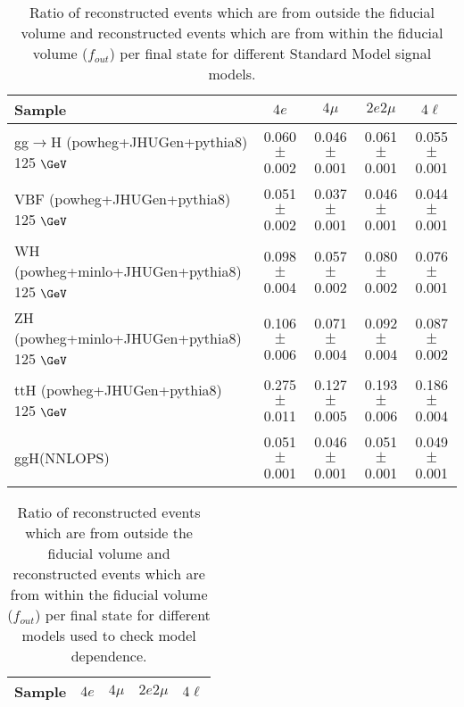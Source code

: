 \documentclass{article}
\begin{document}
\begin{table}[!h!tb]
\begin{center}
\small
\caption{
Ratio of reconstructed events which are from outside the fiducial volume and reconstructed events which are from within the fiducial volume ($f_{out}$) per final state for different Standard Model signal models.
\label{tab:foutSM}
}
\begin{tabular}{|l|c|c|c|c|} \hline 
Sample & $4e$ & $4\mu$ & $2e2\mu$ & $4\ell$ \\ \hline 
gg$\rightarrow$H ({\sc powheg+JHUGen+pythia8}) 125 $\GeV$ & 0.060 $\pm$ 0.002 & 0.046 $\pm$ 0.001 & 0.061 $\pm$ 0.001 & 0.055 $\pm$ 0.001 \\ 
VBF ({\sc powheg+JHUGen+pythia8}) 125 $\GeV$ & 0.051 $\pm$ 0.002 & 0.037 $\pm$ 0.001 & 0.046 $\pm$ 0.001 & 0.044 $\pm$ 0.001 \\ 
WH ({\sc powheg+minlo+JHUGen+pythia8}) 125 $\GeV$ & 0.098 $\pm$ 0.004 & 0.057 $\pm$ 0.002 & 0.080 $\pm$ 0.002 & 0.076 $\pm$ 0.001 \\ 
ZH ({\sc powheg+minlo+JHUGen+pythia8}) 125 $\GeV$ & 0.106 $\pm$ 0.006 & 0.071 $\pm$ 0.004 & 0.092 $\pm$ 0.004 & 0.087 $\pm$ 0.002 \\ 
ttH ({\sc powheg+JHUGen+pythia8}) 125 $\GeV$ & 0.275 $\pm$ 0.011 & 0.127 $\pm$ 0.005 & 0.193 $\pm$ 0.006 & 0.186 $\pm$ 0.004 \\ 
ggH(NNLOPS) & 0.051 $\pm$ 0.001 & 0.046 $\pm$ 0.001 & 0.051 $\pm$ 0.001 & 0.049 $\pm$ 0.001 \\ 

\hline
\end{tabular}
\normalsize
\end{center}
\end{table}
 
 
 
\begin{table}[!h!tb]
\begin{center}
\small
\caption{
Ratio of reconstructed events which are from outside the fiducial volume and reconstructed events which are from within the fiducial volume ($f_{out}$) per final state for different models used to check model dependence.
\label{tab:foutExo}
}
\begin{tabular}{|l|c|c|c|c|} \hline 
Sample & $4e$ & $4\mu$ & $2e2\mu$ & $4\ell$ \\ \hline 

\hline
\end{tabular}
\normalsize
\end{center}
\end{table}
 
\end{document}
